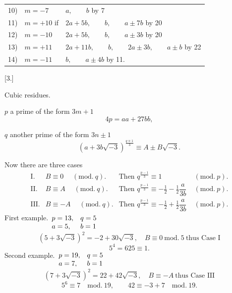 \begin{center}\small\setlength{\tabcolsep}{3pt}\begin{tabular}{@{}rll@{}}
10)&$m=-7$&$a,\qquad b$ by 7\\
11)&$m=+10$ if&$2a+5b,\qquad b,\qquad a\pm7b$ by 20\\
12)&$m=-10$&$2a+5b,\qquad b,\qquad a\pm3b$ by 20\\
13)&$m=+11$&$2a+11b,\qquad b,\qquad2a\pm3b,\qquad a\pm b$ by 22\\
14)&$m=-11$&$b,\qquad a\pm4b$ by 11.
\end{tabular}\end{center}
\begin{center}[3.]\par\smallskip Cubic residues.\end{center}
\noindent\hspace*{\parindent}$p$ a prime of the form $3m+1$
\[4p=aa+27bb,\]
\par\noindent\hspace*{\parindent}$q$ another prime of the form $3n\pm1$
\[(a+3b\sqrt{-3})^{\frac{q\mp1}{3}}\equiv A\pm B\sqrt{-3}.\]
\par\noindent\hspace*{\parindent}Now there are three cases
\[\begin{array}{rlll}
\text{I.}&B\equiv0\quad\;(\mathrm{mod.}\ q).&\text{Then }q^{\frac{p-1}{3}}\equiv1&\;(\mathrm{mod.}\ p).\\[5pt]
\text{II.}&B\equiv A\quad\;(\mathrm{mod.}\ q).&\text{Then }q^{\frac{p-1}{3}}\equiv-\tfrac12-\tfrac12\dfrac{a}{3b}&\;(\mathrm{mod.}\ p).\\[5pt]
\text{III.}&B\equiv-A\quad\;(\mathrm{mod.}\ q).&\text{Then }q^{\frac{p-1}{3}}\equiv-\tfrac12+\tfrac12\dfrac{a}{3b}&\;(\mathrm{mod.}\ p).
\end{array}\]
\noindent\hspace*{\parindent}First example.\qquad $\begin{array}[t]{ll}p=13,&q=5\\a=5,&b=1\end{array}$
\[(5+3\sqrt{-3})^2=-2+30\sqrt{-3},\quad B\equiv0\ \mathrm{mod.}\ 5\ \text{thus Case I}\]
\[5^4=625\equiv1.\]
\noindent\hspace*{\parindent}Second example.\qquad $\begin{array}[t]{ll}p=19,&q=5\\a=7,&b=1\end{array}$
\[(7+3\sqrt{-3})^2=22+42\sqrt{-3},\quad B\equiv-A\ \text{thus Case III}\]
\[5^6\equiv7\quad\mathrm{mod.}\ 19,\qquad42\equiv-3+7\quad\mathrm{mod.}\ 19.\]
